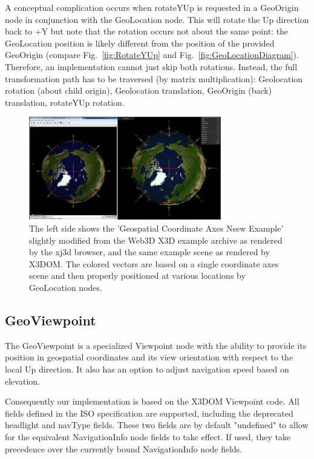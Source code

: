 \documentclass{acmsiggraph}                     %
\begin{document}
A conceptual complication occurs when rotateYUp is requested in a GeoOrigin node in conjunction with the GeoLocation node. This will rotate the Up direction back to +Y but note that the rotation occurs not about the same point: the GeoLocation position is likely different from the position of the provided GeoOrigin (compare Fig.~\ref{fig:RotateYUp} and Fig.~\ref{fig:GeoLocationDiagram}). Therefore, an implementation cannot just skip both rotations. Instead, the full transformation path has to be traversed (by matrix multiplication): Geolocation rotation (about child origin), Geolocation translation, GeoOrigin (back) translation, rotateYUp rotation.

\begin{figure}[htbp]
\centering
\includegraphics[width=3.3in]{Axes_NSEW.png}
\caption{The left side shows the 'Geospatial Coordinate Axes Nsew Example' slightly modified from the Web3D X3D example archive as rendered by the xj3d browser, and the same example scene as rendered by X3DOM. The colored vectors are based on a single coordinate axes scene and then properly positioned at various locations by GeoLocation nodes.}
\label{fig:Axes_NSEW.png}
\end{figure}

\subsection{GeoViewpoint}

The GeoViewpoint is a specialized Viewpoint node with the ability to provide its position in geospatial coordinates and its view orientation with respect to the local Up direction. It also has an option to adjust navigation speed based on elevation.

Consequently our implementation is based on the X3DOM Viewpoint code. All fields defined in the ISO specification are supported, including the deprecated headlight and navType fields. These two fields are by default "undefined" to allow for the equivalent NavigationInfo node fields to take effect. If used, they take precedence over the currently bound NavigationInfo node fields.
\end{document}
